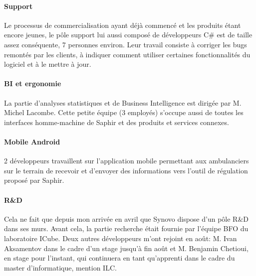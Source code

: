 \documentclass[12pt]{memoir}
\begin{document}
\paragraph{Support}\label{support}

Le processus de commercialisation ayant déjà commencé et les produits
étant encore jeunes, le pôle support lui aussi composé de développeurs
C\# est de taille assez conséquente, 7 personnes environ. Leur travail
consiste à corriger les bugs remontés par les clients, à indiquer
comment utiliser certaines fonctionnalités du logiciel et à le mettre à
jour.

\paragraph{BI et ergonomie}\label{bi-et-ergonomie}

La partie d'analyses statistiques et de Business Intelligence est
dirigée par M. Michel Lacombe. Cette petite équipe (3 employés)
s'occupe aussi de toutes les interfaces homme-machine de Saphir et des
produits et services connexes.

\paragraph{Mobile Android}\label{mobile-android}

2 développeurs travaillent sur l'application mobile permettant aux
ambulanciers sur le terrain de recevoir et d'envoyer des informations
vers l'outil de régulation proposé par Saphir.

\paragraph{R\&D}\label{rd}

Cela ne fait que depuis mon arrivée en avril que Synovo dispose d'un
pôle R\&D dans ses murs. Avant cela, la partie recherche était
fournie par l'équipe BFO du laboratoire ICube. Deux autres développeurs
m'ont rejoint en août: M. Ivan Aksamentov dans le cadre d'un stage
jusqu'à fin août et M. Benjamin Chetioui, en stage pour l'instant, qui
continuera en tant qu'apprenti dans le cadre du master d'informatique,
mention ILC.


\label{sub:Synovo}
\end{document}
